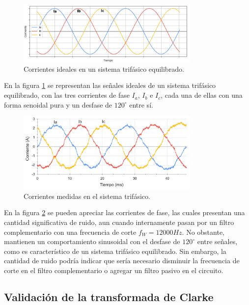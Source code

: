 \documentclass[11pt]{report}
\begin{document}
\begin{figure}[ht]
	\centering
	\includegraphics[width=0.8\textwidth]{imagenes/graficas/Corrientes_ABC_ideal.png}
	\caption{Corrientes ideales en un sistema trifásico equilibrado.}
	\label{corrientes_ABC_ideal}
\end{figure}
\FloatBarrier

En la figura \ref{corrientes_ABC_ideal} se representan las señales ideales de un sistema trifásico equilibrado, con las tres corrientes de fase $I_a$, $I_b$ e $I_c$, cada una de ellas con una forma senoidal pura y un desfase de $120^\circ$ entre sí.

\begin{figure}[ht]
	\centering
	\includegraphics[width=0.8\textwidth]{imagenes/graficas/Corrientes_ABC.png}
	\caption{Corrientes medidas en el sistema trifásico.}
	\label{corrientes_ABC}
\end{figure}
\FloatBarrier

En la figura \ref{corrientes_ABC} se pueden apreciar las corrientes de fase, las cuales presentan una cantidad significativa de ruido, aun cuando internamente pasan por un filtro complementario con una frecuencia de corte $f_W=12000Hz$. No obstante, mantienen un comportamiento sinusoidal con el desfase de $120^\circ$ entre señales, como es característico de un sistema trifásico equilibrado. Sin embargo, la cantidad de ruido podría indicar que sería necesario disminuir la frecuencia de corte en el filtro complementario o agregar un filtro pasivo en el circuito.

\newpage
\subsection{Validación de la transformada de Clarke}
\end{document}
